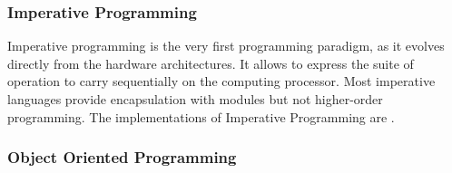 
\subsubsection{Imperative Programming}





Imperative programming is the very first programming paradigm, as it evolves directly from the hardware architectures.
It allows to express the suite of operation to carry sequentially on the computing processor.
Most imperative languages provide encapsulation with modules but not higher-order programming. %
The implementations of Imperative Programming are .

\subsubsection{Object Oriented Programming}

